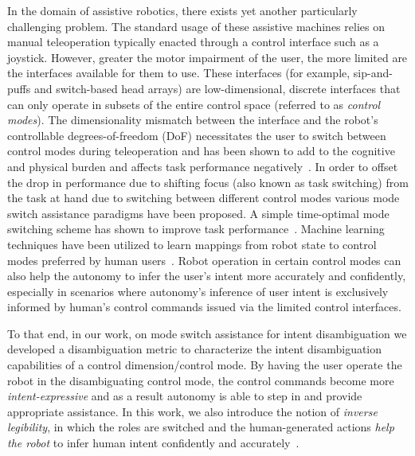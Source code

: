 \documentclass[12pt]{article}
\begin{document}
In the domain of assistive robotics, there exists yet another particularly challenging problem. The standard usage of these assistive machines relies on manual teleoperation typically enacted through a control interface such as a joystick. However, greater the motor impairment of the user, the more limited are the interfaces available for them to use. These interfaces (for example, sip-and-puffs and switch-based head arrays) are low-dimensional, discrete interfaces that can only operate in subsets of the entire control space (referred to as \textit{control modes}). The dimensionality mismatch between the interface and the robot's controllable degrees-of-freedom (DoF) necessitates the user to switch between control modes during teleoperation and has been shown to add to the cognitive and physical burden and affects task performance negatively~\cite{pilarski2012dynamic}.
In order to offset the drop in performance due to shifting focus (also known as task switching) from the task at hand due to switching between different control modes various mode switch assistance paradigms have been proposed. A simple time-optimal mode switching scheme has shown to improve task performance~\cite{herlant2016assistive}. Machine learning techniques have been utilized to learn mappings from robot state to control modes preferred by human users~\cite{jainrobot}. Robot operation in certain control modes can also help the autonomy to infer the user's intent more accurately and confidently, especially in scenarios where autonomy's inference of user intent is exclusively informed by human's control commands issued via the limited control interfaces. 

To that end, in our work, on mode switch assistance for intent disambiguation we developed a disambiguation metric to characterize the intent disambiguation capabilities of a control dimension/control mode. By having the user operate the robot in the disambiguating control mode, the control commands become more \textit{intent-expressive} and as a result autonomy is able to step in and provide appropriate assistance. In this work, we also introduce the notion of \textit{inverse legibility}, in which the roles are switched and the human-generated actions \textit{help the robot} to infer human intent confidently and accurately~\cite{gopinath2017mode}. 
\end{document}
